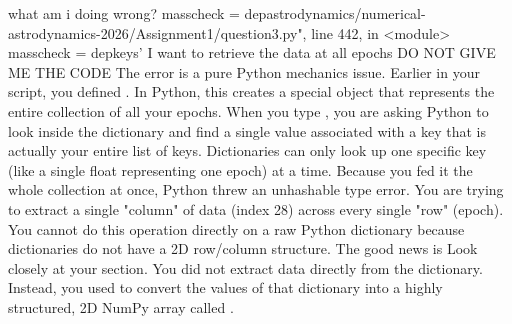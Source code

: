 {}\markdownRendererThematicBreak{}\markdownRendererInterblockSeparator
{}
\markdownRendererSectionEnd 
\markdownRendererSectionEnd \markdownRendererSectionBegin
{}\markdownRendererInterblockSeparator
{}what am i doing wrong? masscheck = depastrodynamics/numerical-astrodynamics-2026/Assignment1/question3.py", line 442, in <module> masscheck = depkeys' I want to retrieve the data at all epochs DO NOT GIVE ME THE CODE\markdownRendererInterblockSeparator
{}
\markdownRendererSectionEnd \markdownRendererSectionBegin
{}\markdownRendererInterblockSeparator
{}\markdownRendererSectionBegin
{}\markdownRendererInterblockSeparator
{}The error  is a pure Python mechanics issue.\markdownRendererInterblockSeparator
{}Earlier in your script, you defined . In Python, this creates a special object that represents the entire collection of all your epochs.\markdownRendererInterblockSeparator
{}When you type , you are asking Python to look inside the dictionary and find a single value associated with a key that is actually your entire list of keys. Dictionaries can only look up one specific key (like a single float representing one epoch) at a time. Because you fed it the whole collection at once, Python threw an unhashable type error.\markdownRendererInterblockSeparator
{}
\markdownRendererSectionEnd \markdownRendererSectionBegin
{}\markdownRendererInterblockSeparator
{}You are trying to extract a single "column" of data (index 28) across every single "row" (epoch). You cannot do this operation directly on a raw Python dictionary because dictionaries do not have a 2D row/column structure.\markdownRendererInterblockSeparator
{}The good news is \markdownRendererInterblockSeparator
{}Look closely at your  section. You did not extract data directly from the  dictionary. Instead, you used  to convert the values of that dictionary into a highly structured, 2D NumPy array called .\markdownRendererInterblockSeparator
